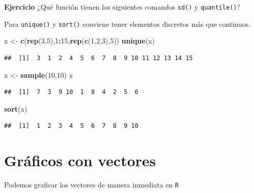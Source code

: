 \documentclass[
]{book}
\newenvironment{Shaded}{\begin{snugshade}}{\end{snugshade}}
\newcommand{\DecValTok}[1]{\textcolor[rgb]{0.00,0.00,0.81}{#1}}
\newcommand{\FunctionTok}[1]{\textcolor[rgb]{0.13,0.29,0.53}{\textbf{#1}}}
\newcommand{\NormalTok}[1]{#1}
\newcommand{\OtherTok}[1]{\textcolor[rgb]{0.56,0.35,0.01}{#1}}
\newcommand{\SpecialCharTok}[1]{\textcolor[rgb]{0.81,0.36,0.00}{\textbf{#1}}}
\begin{document}
\textbf{Ejercicio} ¿Qué función tienen los siguientes comandos \texttt{sd()} y \texttt{quantile()}?

Para \texttt{unique()} y \texttt{sort()} conviene tener elementos discretos más que continuos.

\begin{Shaded}
\begin{Highlighting}[]
\NormalTok{x }\OtherTok{\textless{}{-}} \FunctionTok{c}\NormalTok{(}\FunctionTok{rep}\NormalTok{(}\DecValTok{3}\NormalTok{,}\DecValTok{5}\NormalTok{),}\DecValTok{1}\SpecialCharTok{:}\DecValTok{15}\NormalTok{,}\FunctionTok{rep}\NormalTok{(}\FunctionTok{c}\NormalTok{(}\DecValTok{1}\NormalTok{,}\DecValTok{2}\NormalTok{,}\DecValTok{3}\NormalTok{),}\DecValTok{5}\NormalTok{))}
\FunctionTok{unique}\NormalTok{(x)}
\end{Highlighting}
\end{Shaded}

\begin{verbatim}
##  [1]  3  1  2  4  5  6  7  8  9 10 11 12 13 14 15
\end{verbatim}

\begin{Shaded}
\begin{Highlighting}[]
\NormalTok{x }\OtherTok{\textless{}{-}} \FunctionTok{sample}\NormalTok{(}\DecValTok{10}\NormalTok{,}\DecValTok{10}\NormalTok{)}
\NormalTok{x}
\end{Highlighting}
\end{Shaded}

\begin{verbatim}
##  [1]  7  3  9 10  1  8  4  2  5  6
\end{verbatim}

\begin{Shaded}
\begin{Highlighting}[]
\FunctionTok{sort}\NormalTok{(x)}
\end{Highlighting}
\end{Shaded}

\begin{verbatim}
##  [1]  1  2  3  4  5  6  7  8  9 10
\end{verbatim}

\section{Gráficos con vectores}\label{gruxe1ficos-con-vectores}

Podemos graficar los vectores de manera inmediata en \texttt{R}
\end{document}
